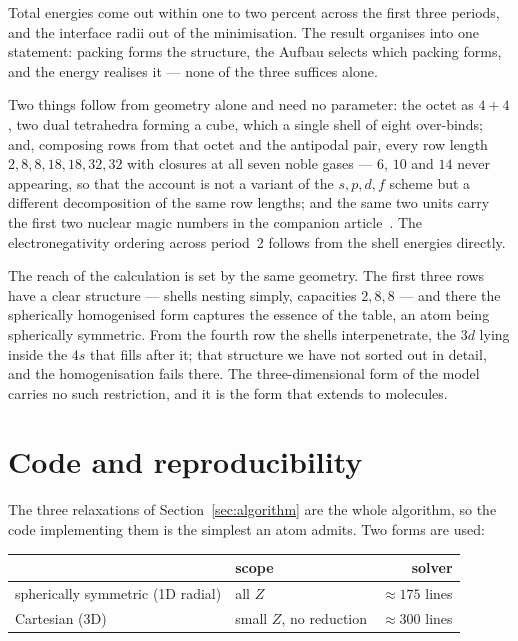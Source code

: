 \documentclass[11pt]{article}
\begin{document}
Total energies come out within one to two percent across the first three periods, and the
interface radii out of the minimisation. The result organises into one statement: packing forms
the structure, the Aufbau selects which packing forms, and the energy realises it --- none of
the three suffices alone.

Two things follow from geometry alone and need no parameter: the octet as $4{+}4$, two dual
tetrahedra forming a cube, which a single shell of eight over-binds; and, composing rows from
that octet and the antipodal pair, every row length $2,8,8,18,18,32,32$ with closures at all
seven noble gases --- $6$, $10$ and $14$ never appearing, so that the account is not a variant of
the $s,p,d,f$ scheme but a different decomposition of the same row lengths; and the same two
units carry the first two nuclear magic numbers in the companion
article~\cite{Johnson-RealNucleus}. The electronegativity ordering across period~2 follows from
the shell energies directly.

The reach of the calculation is set by the same geometry. The first three rows have a clear
structure --- shells nesting simply, capacities $2,8,8$ --- and there the spherically homogenised
form captures the essence of the table, an atom being spherically symmetric. From the fourth
row the shells interpenetrate, the $3d$ lying inside the $4s$ that fills after it; that
structure we have not sorted out in detail, and the homogenisation fails there. The
three-dimensional form of the model carries no such restriction, and it is the form that
extends to molecules.

\section{Code and reproducibility}\label{sec:code}

The three relaxations of Section~\ref{sec:algorithm} are the whole algorithm, so the code
implementing them is the simplest an atom admits. Two forms are used:

\begin{center}\footnotesize
\begin{tabular}{llr}
\toprule
 & scope & solver \\
\midrule
spherically symmetric (1D radial) & all $Z$                   & $\approx175$ lines \\
Cartesian (3D)                    & small $Z$, no reduction   & $\approx300$ lines \\
\bottomrule
\end{tabular}
\end{center}
\end{document}
